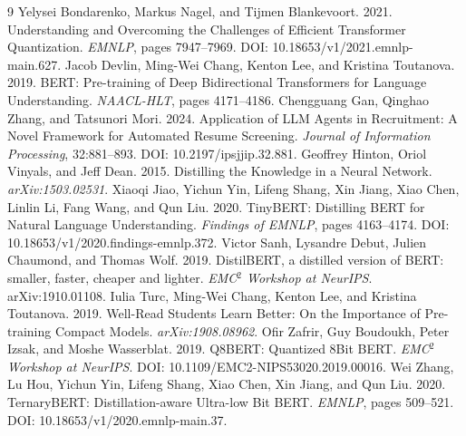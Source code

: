 \documentclass[11pt]{article}
\begin{document}
\balance
\begin{thebibliography}{9}
 Yelysei Bondarenko, Markus Nagel, and Tijmen Blankevoort. 2021. Understanding and Overcoming the Challenges of Efficient Transformer Quantization. \emph{EMNLP}, pages 7947--7969. DOI: 10.18653/v1/2021.emnlp-main.627.
 Jacob Devlin, Ming-Wei Chang, Kenton Lee, and Kristina Toutanova. 2019. BERT: Pre-training of Deep Bidirectional Transformers for Language Understanding. \emph{NAACL-HLT}, pages 4171--4186.
 Chengguang Gan, Qinghao Zhang, and Tatsunori Mori. 2024. Application of LLM Agents in Recruitment: A Novel Framework for Automated Resume Screening. \emph{Journal of Information Processing}, 32:881--893. DOI: 10.2197/ipsjjip.32.881.
 Geoffrey Hinton, Oriol Vinyals, and Jeff Dean. 2015. Distilling the Knowledge in a Neural Network. \emph{arXiv:1503.02531}.
 Xiaoqi Jiao, Yichun Yin, Lifeng Shang, Xin Jiang, Xiao Chen, Linlin Li, Fang Wang, and Qun Liu. 2020. TinyBERT: Distilling BERT for Natural Language Understanding. \emph{Findings of EMNLP}, pages 4163--4174. DOI: 10.18653/v1/2020.findings-emnlp.372.
 Victor Sanh, Lysandre Debut, Julien Chaumond, and Thomas Wolf. 2019. DistilBERT, a distilled version of BERT: smaller, faster, cheaper and lighter. \emph{EMC$^2$ Workshop at NeurIPS}. arXiv:1910.01108.
 Iulia Turc, Ming-Wei Chang, Kenton Lee, and Kristina Toutanova. 2019. Well-Read Students Learn Better: On the Importance of Pre-training Compact Models. \emph{arXiv:1908.08962}.
 Ofir Zafrir, Guy Boudoukh, Peter Izsak, and Moshe Wasserblat. 2019. Q8BERT: Quantized 8Bit BERT. \emph{EMC$^2$ Workshop at NeurIPS}. DOI: 10.1109/EMC2-NIPS53020.2019.00016.
 Wei Zhang, Lu Hou, Yichun Yin, Lifeng Shang, Xiao Chen, Xin Jiang, and Qun Liu. 2020. TernaryBERT: Distillation-aware Ultra-low Bit BERT. \emph{EMNLP}, pages 509--521. DOI: 10.18653/v1/2020.emnlp-main.37.
\end{thebibliography}
\end{document}
